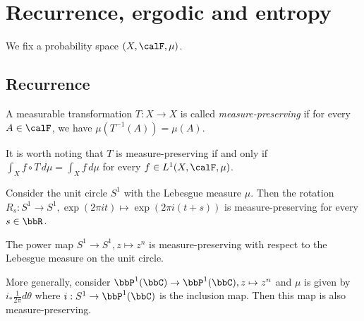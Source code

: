 \section{Recurrence, ergodic and entropy}


  We fix a probability space $(X, \calF, \mu)$.


\subsection{Recurrence}


  \begin{definition}
    A measurable transformation $T: X \to X$ is called \emph{measure-preserving} if for every $A \in \calF$, we have $\mu(T^{-1}(A)) = \mu(A)$.
  \end{definition}

  It is worth noting that $T$ is measure-preserving if and only if $\int_X f \circ T \, d\mu = \int_X f \, d\mu$ for every $f \in L^1(X, \calF, \mu)$.

  \begin{example}
    Consider the unit circle $S^1$ with the Lebesgue measure $\mu$. 
    Then the rotation $R_s: S^1 \to S^1, \exp(2\pi i t) \mapsto \exp(2\pi i (t + s))$ is measure-preserving for every $s \in \bbR$.
  \end{example}

  \begin{example}
    The power map $S^1 \to S^1, z \mapsto z^n$ is measure-preserving with respect to the Lebesgue measure on the unit circle.

    More generally, consider $\bbP^1(\bbC) \to \bbP^1(\bbC), z \mapsto z^n$ and $\mu$ is given by $i_* \frac{1}{2\pi} d\theta$ where $i: S^1 \to \bbP^1(\bbC)$ is the inclusion map. 
    Then this map is also measure-preserving.
  \end{example}


